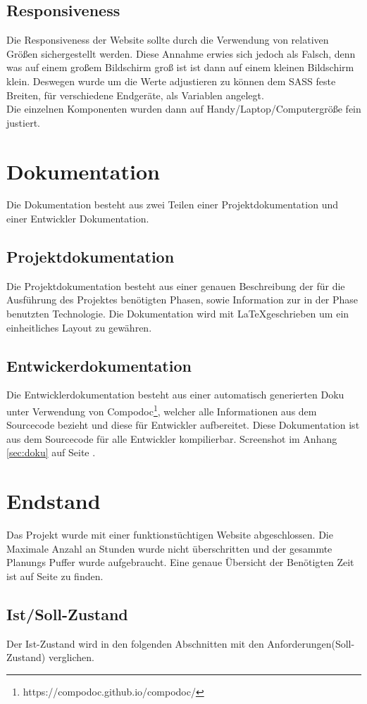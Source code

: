 \documentclass[11pt,a4paper]{article}
\begin{document}
\subsection{Responsiveness}
Die Responsiveness der Website sollte durch die Verwendung von relativen Größen sichergestellt werden. Diese Annahme erwies sich jedoch als Falsch, denn was auf einem großem Bildschirm groß ist ist dann auf einem kleinen Bildschirm klein. Deswegen wurde um die Werte adjustieren zu können dem SASS feste Breiten, für verschiedene Endgeräte, als Variablen angelegt.\\Die einzelnen Komponenten wurden dann auf Handy/Laptop/Computergröße fein justiert.  
\section{Dokumentation}
Die Dokumentation besteht aus zwei Teilen einer Projektdokumentation und einer Entwickler Dokumentation.
\subsection{Projektdokumentation}
Die Projektdokumentation besteht aus einer genauen Beschreibung der für die Ausführung des Projektes benötigten Phasen, sowie Information zur in der Phase benutzten Technologie.
Die Dokumentation wird mit \LaTeX geschrieben um ein einheitliches Layout zu gewähren.
\subsection{Entwickerdokumentation}
Die Entwicklerdokumentation besteht aus einer automatisch generierten Doku unter Verwendung von Compodoc\footnote{https://compodoc.github.io/compodoc/}, welcher alle Informationen aus dem Sourcecode bezieht und diese für Entwickler aufbereitet. Diese Dokumentation ist aus dem Sourcecode für alle Entwickler kompilierbar. Screenshot im Anhang \ref{sec:doku} auf Seite \pageref{sec:doku}.
\section{Endstand}
Das Projekt wurde mit einer funktionstüchtigen Website abgeschlossen.  Die Maximale Anzahl an Stunden wurde nicht überschritten und der gesammte Planungs Puffer wurde aufgebraucht. Eine genaue Übersicht der Benötigten Zeit ist auf Seite \pageref{sec:time} zu finden.
\subsection{Ist/Soll-Zustand}
Der Ist-Zustand wird in den folgenden Abschnitten mit den Anforderungen(Soll-Zustand) verglichen.
\end{document}
